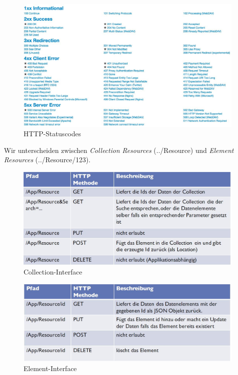 \begin{figure}[h!]
\centering
\includegraphics[width=1\linewidth]{fig/http-statuscodes}
\caption{HTTP-Statuscodes}
\label{fig:http-statuscodes}
\end{figure}

Wir unterscheiden zwischen \emph{Collection Resources} (../Resource)  und \emph{Element Resources} (../Resource/123).

\begin{figure}[h!]
\centering
\includegraphics[width=0.7\linewidth]{fig/rest-collection-interface}
\caption{Collection-Interface}
\label{fig:rest-collection-interface}
\end{figure}

\begin{figure}[h!]
\centering
\includegraphics[width=0.7\linewidth]{fig/rest-element-interface}
\caption{Element-Interface}
\label{fig:rest-element-interface}
\end{figure}

